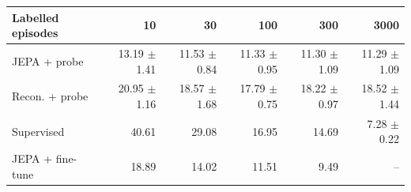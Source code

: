 \begin{tabular}{lrrrrr}
\toprule
Labelled episodes & 10 & 30 & 100 & 300 & 3000\\
\midrule
JEPA + probe & 13.19 $\pm$ 1.41 & 11.53 $\pm$ 0.84 & 11.33 $\pm$ 0.95 & 11.30 $\pm$ 1.09 & 11.29 $\pm$ 1.09\\
Recon. + probe & 20.95 $\pm$ 1.16 & 18.57 $\pm$ 1.68 & 17.79 $\pm$ 0.75 & 18.22 $\pm$ 0.97 & 18.52 $\pm$ 1.44\\
Supervised & 40.61 & 29.08 & 16.95 & 14.69 & 7.28 $\pm$ 0.22\\
JEPA + fine-tune & 18.89 & 14.02 & 11.51 & 9.49 & --\\
\bottomrule
\end{tabular}